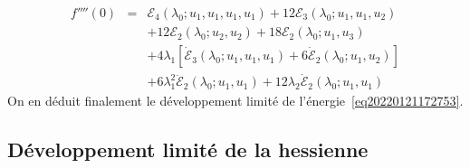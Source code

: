 \documentclass{article}
\begin{document}
\begin{eqnarray}
  f'''' (0) & = & \mathcal{E}_4 (\lambda_0 ; u_1, u_1, u_1, u_1) +
  12\mathcal{E}_3 (\lambda_0 ; u_1, u_1, u_2) \nonumber\\
  &  & + 12\mathcal{E}_2 (\lambda_0 ; u_2, u_2) + 18\mathcal{E}_2 (\lambda_0
  ; u_1, u_3) \nonumber\\
  &  & + 4 \lambda_1  [\dot{\mathcal{E}}_3 (\lambda_0 ; u_1, u_1, u_1) + 6
  \dot{\mathcal{E}}_2 (\lambda_0 ; u_1, u_2)] \nonumber\\
  &  & + 6 \lambda_1^2  \ddot{\mathcal{E}}_2 (\lambda_0 ; u_1, u_1) + 12
  \lambda_2  \dot{\mathcal{E}}_2 (\lambda_0 ; u_1, u_1)
\end{eqnarray}
On en d{\'e}duit finalement le d{\'e}veloppement limit{\'e} de
l'{\'e}nergie~\eqref{eq20220121172753}.

\subsection{D{\'e}veloppement limit{\'e} de la
hessienne}\label{sec20211115081016}
\end{document}
